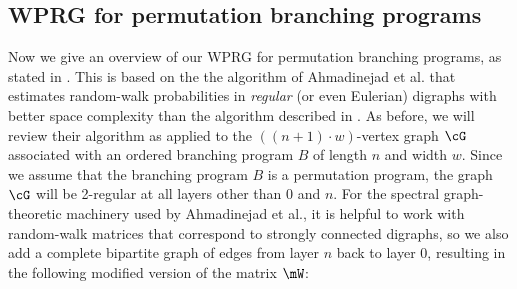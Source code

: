     \subsection{WPRG for permutation branching programs}\label{subsec:PBP_proof_overview}
    Now we give an overview of our WPRG for permutation branching programs, as stated in . This is based on the
    the algorithm of 
%
Ahmadinejad  %
et al. that estimates random-walk probabilities in \emph{regular} (or even Eulerian) digraphs with better space complexity than the algorithm described in .  As before, we will review their algorithm as applied to the $((n+1)\cdot w)$-vertex graph $\cG$ associated with an ordered branching program $B$ of length $n$ and width $w$.  Since we assume that the branching program $B$ is a permutation program, the graph $\cG$ will be 2-regular at all layers other than $0$ and $n$.  For the spectral graph-theoretic machinery used by 
%
Ahmadinejad  %
et al., it is helpful to work with random-walk matrices that correspond to strongly connected digraphs, so we also add a complete bipartite graph of edges from layer $n$ back to layer $0$, resulting in the following modified version of the matrix $\mW$:
    
